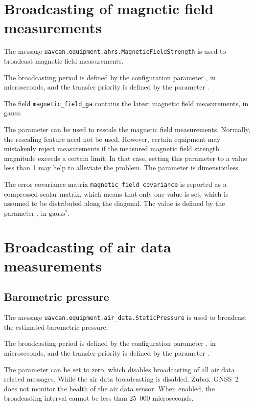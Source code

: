 \documentclass{zubaxdoc}
\begin{document}
\section{Broadcasting of magnetic field measurements}

The message \verb|uavcan.equipment.ahrs.MagneticFieldStrength| is used to broadcast magnetic field measurements.

The broadcasting period is defined by the configuration
parameter , in microseconds, and the transfer priority is defined by the
parameter .

The field \verb|magnetic_field_ga| contains the latest magnetic field measurements, in gauss.

The parameter  can be used to rescale the magnetic field measurements.
Normally, the rescaling feature need not be used.
However, certain equipment may mistakenly reject measurements if the measured
magnetic field strength magnitude exceeds a certain limit.
In that case, setting this parameter to a value less than 1 may help to alleviate the problem.
The parameter is dimensionless.

The error covariance matrix \verb|magnetic_field_covariance| is reported as a compressed scalar matrix,
which means that only one value is set, which is assumed to be distributed along the diagonal.
The value is defined by the parameter , in $\text{gauss}^2$.

\section{Broadcasting of air data measurements}

\subsection{Barometric pressure}

The message \verb|uavcan.equipment.air_data.StaticPressure| is used to broadcast the
estimated barometric pressure.

The broadcasting period is defined by the configuration
parameter , in microseconds, and the transfer priority is defined by the
parameter .

The parameter  can be set to zero, which disables broadcasting of all
air data related messages.
While the air data broadcasting is disabled, Zubax~GNSS~2 does not monitor the health of the
air data sensor.
When enabled, the broadcasting interval cannot be less than 25~000 microseconds.
\end{document}
